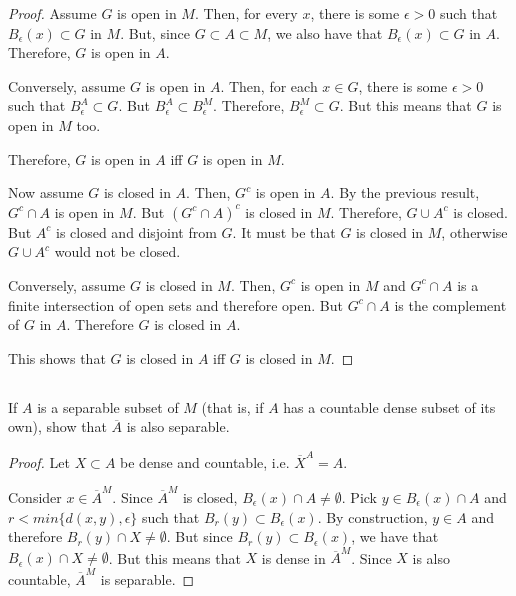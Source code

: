 \begin{proof}
Assume $G$ is open in $M$. Then, for every $x$, there is some $\epsilon>0$ such that $B_\epsilon(x) \subset G$ in $M$. But, since $G \subset A \subset M$, we also have that $B_\epsilon(x) \subset G$ in $A$. Therefore, $G$ is open in $A$.

Conversely, assume $G$ is open in $A$. Then, for each $x \in G$, there is some $\epsilon > 0$ such that $B_\epsilon^A \subset G$. But $B_\epsilon^A \subset B_\epsilon^M$. Therefore, $B_\epsilon^M \subset G$. But this means that $G$ is open in $M$ too.

Therefore, $G$ is open in $A$ iff $G$ is open in $M$.

\vspace{1em}

Now assume $G$ is closed in $A$. Then, $G^c$ is open in $A$. By the previous result, $G^c \cap A$ is open in $M$. But $(G^c \cap A)^c$ is closed in $M$. Therefore, $G \cup A^c$ is closed. But $A^c$ is closed and disjoint from $G$. It must be that $G$ is closed in $M$, otherwise $G \cup A^c$ would not be closed.

Conversely, assume $G$ is closed in $M$. Then, $G^c$ is open in $M$ and $G^c \cap A$ is a finite intersection of open sets and therefore open. But $G^c \cap A$ is the complement of $G$ in $A$. Therefore $G$ is closed in $A$.

This shows that $G$ is closed in $A$ iff $G$ is closed in $M$.
\end{proof}



\subsection{} If $A$ is a separable subset of $M$ (that is, if $A$ has a countable dense subset of its own), show that $\overline{A}$ is also separable.

\begin{proof}
Let $X \subset A$ be dense and countable, i.e. $\overline{X}^A = A$. 

Consider $x \in \overline{A}^M$. Since $\overline{A}^M$ is closed, $B_\epsilon(x) \cap A \neq \emptyset$. Pick $y \in B_\epsilon(x) \cap A$ and $r < min\{d(x,y), \epsilon\}$ such that $B_r(y) \subset B_\epsilon(x)$. By construction, $y \in A$ and therefore $B_r(y) \cap X \neq \emptyset$. But since $B_r(y) \subset B_\epsilon(x)$, we have that $B_\epsilon(x) \cap X \neq \emptyset$. But this means that $X$ is dense in $\overline{A}^M$. Since $X$ is also countable, $\overline{A}^M$ is separable. 

\end{proof}

